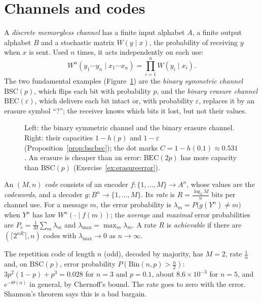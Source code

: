 \section{Channels and codes}\label{sec:dmc}

A \emph{discrete memoryless channel} has a finite input alphabet $A$, a finite output alphabet $B$ and a stochastic matrix $W(y\mid x)$, the probability of receiving $y$ when $x$ is sent. Used $n$ times, it acts independently on each use:
\[
W^n(y_1\cdots y_n\mid x_1\cdots x_n)=\prod_{i=1}^nW(y_i\mid x_i).
\]
The two fundamental examples (Figure~\ref{fig:channels}) are the \emph{binary symmetric channel} $\mathrm{BSC}(p)$, which flips each bit with probability $p$, and the \emph{binary erasure channel} $\mathrm{BEC}(\varepsilon)$, which delivers each bit intact or, with probability $\varepsilon$, replaces it by an erasure symbol ``?''; the receiver knows which bits it lost, but not their values.

\begin{figure}[ht]
\centering
{}
\caption{Left: the binary symmetric channel and the binary erasure channel. Right: their capacities $1-h(p)$ and $1-\varepsilon$ (Proposition~\ref{prop:bscbec}); the dot marks $C=1-h(0.1)\approx0.531$. An erasure is cheaper than an error: $\mathrm{BEC}(2p)$ has more capacity than $\mathrm{BSC}(p)$ (Exercise~\ref{ex:erasureerror}).}
\label{fig:channels}
\end{figure}

\begin{definition}\label{def:code}
An $(M,n)$ \emph{code} consists of an encoder $f:\{1,\dots,M\}\to A^n$, whose values are the \emph{codewords}, and a decoder $g:B^n\to\{1,\dots,M\}$. Its \emph{rate} is $R=\frac{\log_2M}n$ bits per channel use. For a message $m$, the error probability is $\lambda_m=P\bigl(g(Y^n)\ne m\bigr)$ when $Y^n$ has law $W^n(\cdot\mid f(m))$; the \emph{average} and \emph{maximal} error probabilities are $P_e=\frac1M\sum_m\lambda_m$ and $\lambda_{\max}=\max_m\lambda_m$. A rate $R$ is \emph{achievable} if there are $(\lceil2^{nR}\rceil,n)$ codes with $\lambda_{\max}\to0$ as $n\to\infty$.
\end{definition}

The repetition code of length $n$ (odd), decoded by majority, has $M=2$, rate $\frac1n$ and, on $\mathrm{BSC}(p)$, error probability $P(\mathrm{Bin}(n,p)>\frac n2)$: $3p^2(1-p)+p^3=0.028$ for $n=3$ and $p=0.1$, about $8.6\times10^{-3}$ for $n=5$, and $e^{-\Theta(n)}$ in general, by Chernoff's bound. The rate goes to zero with the error. Shannon's theorem says this is a bad bargain.


